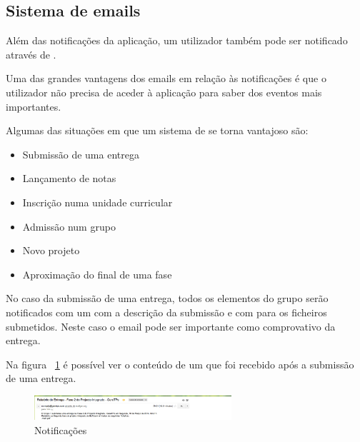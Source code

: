 \subsection{Sistema de emails}

Além das notificações da aplicação, um utilizador também pode ser notificado através de .

Uma das grandes vantagens dos emails em relação às notificações é que o utilizador não precisa de aceder à aplicação para saber dos eventos mais importantes.

Algumas das situações em que um sistema de  se torna  vantajoso são:

\begin{itemize}
	\item Submissão de uma entrega
	\item Lançamento de notas
	\item Inscrição numa unidade curricular
	\item Admissão num grupo
	\item Novo projeto
	\item Aproximação do final de uma fase
\end{itemize}

No caso da submissão de uma entrega, todos os elementos do grupo serão notificados com um  com a descrição da submissão e com  para os ficheiros submetidos. Neste caso o email pode ser importante como comprovativo da entrega.

Na figura ~\ref{fig:mail} é possível ver o conteúdo de um  que foi recebido após a submissão de uma entrega.

\begin{figure}[H]
	\centering
	\includegraphics[width=0.65\textwidth,center]{images/implementacao/alunos/emails}
	\caption{Notificações}
	\label{fig:mail}
\end{figure}
